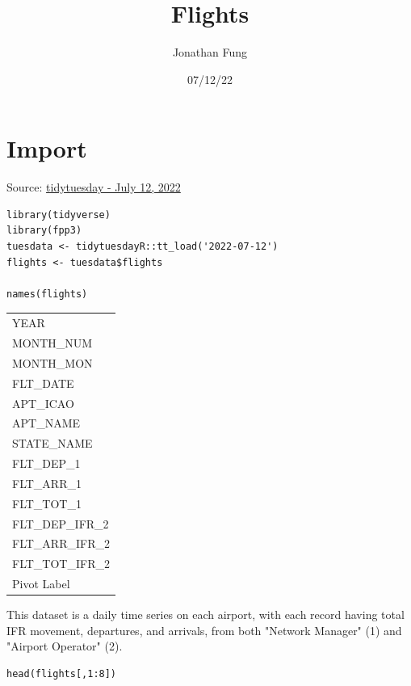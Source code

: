 \documentclass[8pt]{article}
\author{Jonathan Fung}
\date{07/12/22}
\title{Flights}
\begin{document}
\maketitle
\tableofcontents

\begin{latex}
\pagebreak
\end{latex}
\section{Import}
\label{sec:org7402cf0}
Source: \href{https://github.com/rfordatascience/tidytuesday/tree/master/data/2022/2022-07-12}{tidytuesday - July 12, 2022}

\begin{verbatim}
library(tidyverse)
library(fpp3)
tuesdata <- tidytuesdayR::tt_load('2022-07-12')
flights <- tuesdata$flights

names(flights)
\end{verbatim}

\begin{center}
\begin{tabular}{l}
YEAR\\
MONTH\_NUM\\
MONTH\_MON\\
FLT\_DATE\\
APT\_ICAO\\
APT\_NAME\\
STATE\_NAME\\
FLT\_DEP\_1\\
FLT\_ARR\_1\\
FLT\_TOT\_1\\
FLT\_DEP\_IFR\_2\\
FLT\_ARR\_IFR\_2\\
FLT\_TOT\_IFR\_2\\
Pivot Label\\
\end{tabular}
\end{center}

This dataset is a daily time series on each airport, with each record having total IFR movement, departures, and arrivals, from both "Network Manager" (1) and "Airport Operator" (2).

\begin{verbatim}
head(flights[,1:8])
\end{verbatim}
\end{document}
